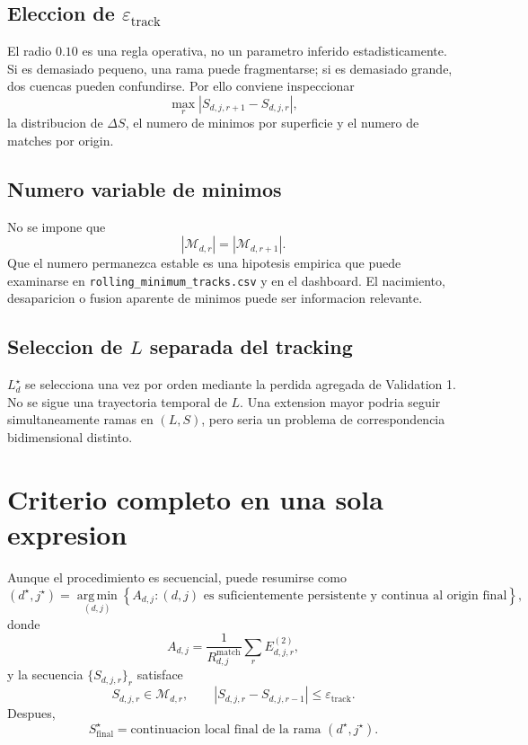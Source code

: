 \documentclass[11pt]{article}
\newcommand{\argmin}{\operatorname*{arg\,min}}
\begin{document}
\subsection{Eleccion de \(\varepsilon_{\mathrm{track}}\)}

El radio \(0.10\) es una regla operativa, no un parametro inferido
estadisticamente. Si es demasiado pequeno, una rama puede fragmentarse; si es
demasiado grande, dos cuencas pueden confundirse. Por ello conviene inspeccionar
\[
\max_r|S_{d,j,r+1}-S_{d,j,r}|,
\]
la distribucion de \(\Delta S\), el numero de minimos por superficie y el
numero de matches por origin.

\subsection{Numero variable de minimos}

No se impone que
\[
|\mathcal{M}_{d,r}|
=
|\mathcal{M}_{d,r+1}|.
\]
Que el numero permanezca estable es una hipotesis empirica que puede examinarse
en \texttt{rolling\_minimum\_tracks.csv} y en el dashboard. El nacimiento,
desaparicion o fusion aparente de minimos puede ser informacion relevante.

\subsection{Seleccion de \(L\) separada del tracking}

\(L_d^\star\) se selecciona una vez por orden mediante la perdida agregada de
Validation 1. No se sigue una trayectoria temporal de \(L\). Una extension
mayor podria seguir simultaneamente ramas en \((L,S)\), pero seria un problema
de correspondencia bidimensional distinto.

\section{Criterio completo en una sola expresion}

Aunque el procedimiento es secuencial, puede resumirse como
\begin{equation}
(d^\star,j^\star)
=
\argmin_{(d,j)}
\left\{
A_{d,j}:
(d,j)\text{ es suficientemente persistente y continua al origin final}
\right\},
\label{eq:concept}
\end{equation}
donde
\[
A_{d,j}
=
\frac{1}{R^{\mathrm{match}}_{d,j}}
\sum_r E^{(2)}_{d,j,r},
\]
y la secuencia \(\{S_{d,j,r}\}_r\) satisface
\[
S_{d,j,r}\in\mathcal{M}_{d,r},
\qquad
|S_{d,j,r}-S_{d,j,r-1}|
\le
\varepsilon_{\mathrm{track}}.
\]
Despues,
\[
S_{\mathrm{final}}^\star
=
\text{continuacion local final de la rama }(d^\star,j^\star).
\]
\end{document}
